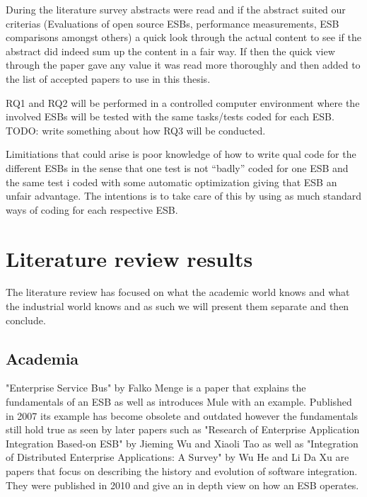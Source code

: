 \documentclass{llncs}
\begin{document}
During the literature survey abstracts were read and if the abstract suited our criterias (Evaluations of open source ESBs, performance measurements, ESB comparisons amongst others) a quick look through the actual content to see if the abstract did indeed sum up the content in a fair way. If then the quick view through the paper gave any value it was read more thoroughly and then added to the list of accepted papers to use in this thesis.


RQ1 and RQ2 will be performed in a controlled computer environment where the involved ESBs will be tested with the same tasks/tests coded for each ESB.
TODO: write something about how RQ3 will be conducted.


Limitiations that could arise is poor knowledge of how to write qual code for the different ESBs in the sense that one test is not ``badly'' coded for one ESB and the same test i coded with some automatic optimization giving that ESB an unfair advantage. The intentions is to take care of this by using as much standard ways of coding for each respective ESB.

\label{sec:method}
\section{Literature review results}
\label{sec:litrev}

The literature review has focused on what the academic world knows and what the industrial world knows and as such we will present them separate and then conclude.

\subsection{Academia}
"Enterprise Service Bus"\cite{falko07} by Falko Menge is a paper that explains the fundamentals of an ESB as well as introduces Mule with an example. Published in 2007 its example has become obsolete and outdated however the fundamentals still hold true as seen by later papers such as "Research of Enterprise Application Integration Based-on ESB" \cite{Jieming2010} by Jieming Wu and Xiaoli Tao as well as "Integration of Distributed Enterprise Applications: A Survey" \cite{HeIntegration} by Wu He and Li Da Xu are papers that focus on describing the history and evolution of software integration. They were published in 2010 and give an in depth view on how an ESB  operates.
\end{document}
